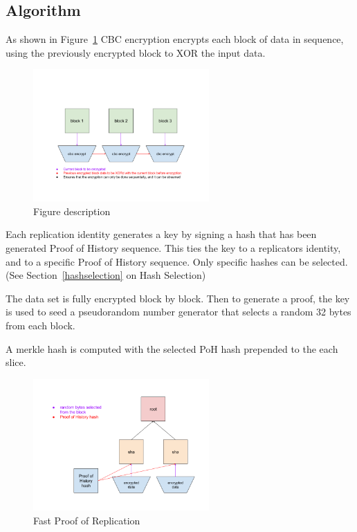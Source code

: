 \documentclass[12pt]{article}
\begin{document}
\subsection{Algorithm}
As shown in Figure~\ref{fig:encrypt} CBC encryption encrypts each block of data in sequence, using the previously encrypted block to XOR the input data.

\begin{figure}
  \begin{center}
    \centering
    \includegraphics[width=0.6\textwidth]{figures/fig_7.png}
    \caption[Fig 7]{Figure description \label{fig:encrypt}}
  \end{center}
  \end{figure}

Each replication identity generates a key by signing a hash that has been generated Proof of History sequence.  This ties the key to a replicators identity, and to a specific Proof of History sequence.  Only specific hashes can be selected.  (See Section~\ref{hashselection} on Hash Selection)

The data set is fully encrypted block by block.  Then to generate a proof, the key is used to seed a pseudorandom number generator that selects a random 32 bytes from each block.

A merkle hash is computed with the selected PoH hash prepended to the each slice.

\begin{figure}
  \begin{center}
    \centering
    \includegraphics[width=0.6\textwidth]{figures/fig_8.png}
    \caption[Fig 8]{Fast Proof of Replication\label{fig_8}}
  \end{center}
  \end{figure}
\end{document}

